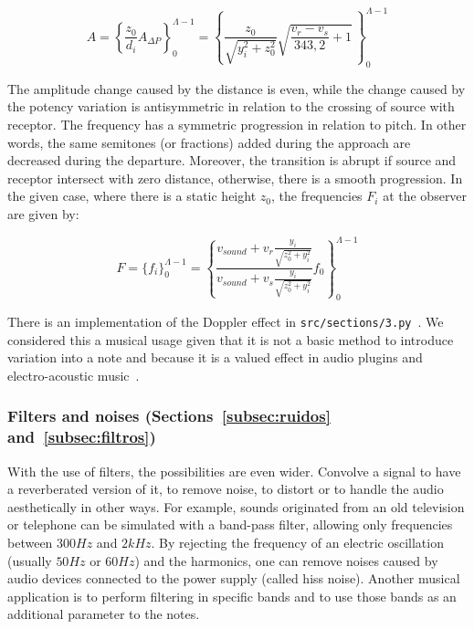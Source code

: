 \begin{equation}\label{eq:aDoppler}
    A=\left\{ \frac{z_0}{d_i}A_{\Delta P}\right\}_0^{\Lambda-1} = \left\{ \frac{z_0}{\sqrt{y_i^2+z_0^2}} \sqrt{\frac{v_r-v_s}{343,2}+1}  \,\right\}_0^{\Lambda-1}
\end{equation}

The amplitude change caused by the distance is even, while the change caused by the potency variation is antisymmetric in
relation to the crossing of source with receptor. The frequency has a symmetric progression in relation to pitch. In other words, the same semitones (or fractions) added during the approach are decreased during the departure. Moreover, the transition is abrupt if source and receptor intersect with zero distance, otherwise, there is a smooth progression.
In the given case, where there is a static height $z_0$, the frequencies $F_i$ at the observer are given by:

\begin{equation}\label{eq:ffDoppler}
    F=\{f_i\}_0^{\Lambda-1}=\left\{\frac{v_{sound} + v_r\frac{y_i}{\sqrt{z_0^2+y_i^2}}}{v_{sound}+v_s\frac{y_i}{\sqrt{z_0^2+y_i^2}}}f_0\right\}_0^{\Lambda-1}
\end{equation}

There is an implementation of the Doppler effect in \texttt{src/sections/3.py}~\cite{MASSA}.
We considered this a musical usage given that it is not a basic method to introduce variation into a note
and because it is a valued effect in audio plugins and electro-acoustic music~\cite{floEsp}.

\subsubsection{Filters and noises (Sections~\ref{subsec:ruidos} and~\ref{subsec:filtros})}
With the use of filters, the possibilities are even wider.
Convolve a signal to have a reverberated version of it, to remove noise, to distort or to handle
the audio aesthetically in other ways. For example, sounds originated from an old television or telephone can be simulated with a band-pass filter, allowing only frequencies between $300Hz$ and $2kHz$. By rejecting the frequency of an electric oscillation (usually $50Hz$ or $60Hz$) and the harmonics, one can remove noises caused by audio devices connected to the power supply (called hiss noise).
Another musical application is to perform filtering in specific bands and to use those bands as an additional parameter to the notes.

